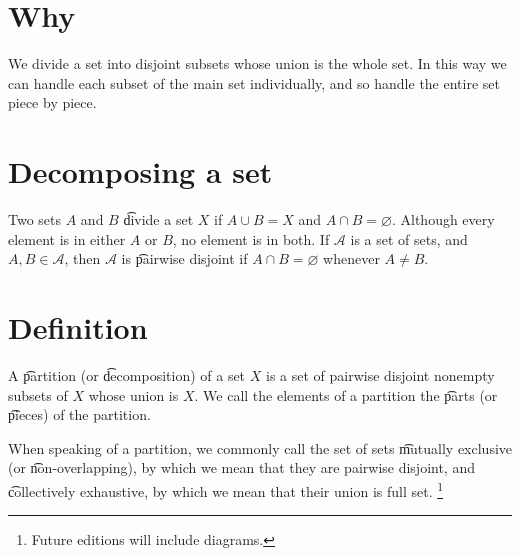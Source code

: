 
\section*{Why}

We divide a set into disjoint subsets whose union is the whole set.
In this way we can handle each subset of the main set individually, and so handle the entire set piece by piece.

\section*{Decomposing a set}

Two sets $A$ and $B$ \t{divide} a set $X$ if $A \cup B = X$ and $A \cap  B = \varnothing$.
Although every element is in either $A$ or $B$, no element is in both.
If $\mathcal{A} $ is a set of sets, and $A, B \in \mathcal{A} $, then $\mathcal{A} $ is \t{pairwise disjoint} if $A \cap  B = \varnothing$ whenever $A \neq B$.

\section*{Definition}

A \t{partition} (or \t{decomposition}) of a set $X$ is a set of pairwise disjoint nonempty subsets of $X$ whose union is $X$.
We call the elements of a partition the \t{parts} (or \t{pieces}) of the partition.

When speaking of a partition, we commonly call the set of sets \t{mutually exclusive} (or \t{non-overlapping}), by which we mean that they are pairwise disjoint, and \t{collectively exhaustive}, by which we mean that their union is full set.
  \ifhmode\unskip\fi\footnote{
Future editions will include diagrams.
  }

\blankpage